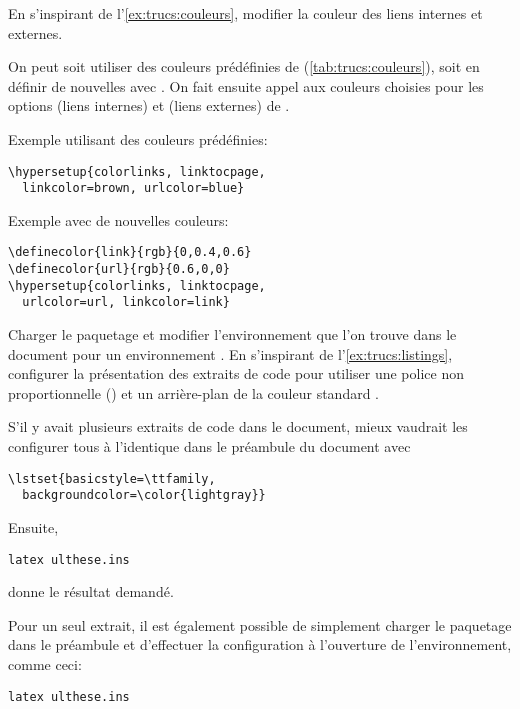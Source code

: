 \begin{exercice}
  En s'inspirant de l'\autoref{ex:trucs:couleurs}, modifier la couleur
  des liens internes et externes.
  \begin{sol}
    On peut soit utiliser des couleurs prédéfinies de 
    (\autoref{tab:trucs:couleurs}), soit en  définir de nouvelles avec
    \cmd{\definecolor}. On fait ensuite appel aux couleurs choisies
    pour les options  (liens internes) et
     (liens externes) de .

    Exemple utilisant des couleurs prédéfinies:
\begin{lstlisting}
\hypersetup{colorlinks, linktocpage,
  linkcolor=brown, urlcolor=blue}
\end{lstlisting}

    Exemple avec de nouvelles couleurs:
\begin{lstlisting}
\definecolor{link}{rgb}{0,0.4,0.6}
\definecolor{url}{rgb}{0.6,0,0}
\hypersetup{colorlinks, linktocpage,
  urlcolor=url, linkcolor=link}
\end{lstlisting}
  \end{sol}
\end{exercice}

\begin{exercice}
  \label{exercice:trucs:n}
  Charger le paquetage  et modifier l'environnement
   que l'on trouve dans le document pour un environnement
  . En s'inspirant de l'\autoref{ex:trucs:listings},
  configurer la présentation des extraits de code pour utiliser une
  police non proportionnelle (\cmdprint{\ttfamily}) et un arrière-plan
  de la couleur standard .
  \begin{sol}
    S'il y avait plusieurs extraits de code dans le document, mieux
    vaudrait les configurer tous à l'identique dans le préambule du
    document avec
\begin{lstlisting}
\lstset{basicstyle=\ttfamily,
  backgroundcolor=\color{lightgray}}
\end{lstlisting}
    Ensuite,
\begin{vglisting}
\begin{lstlisting}
latex ulthese.ins
\end{lstlisting}
\end{vglisting}
    donne le résultat demandé.

    Pour un seul extrait, il est également possible de simplement
    charger le paquetage dans le préambule et d'effectuer la
    configuration à l'ouverture de l'environnement, comme ceci:
\begin{vglisting}
\begin{lstlisting}[basicstyle=\ttfamily,
  backgroundcolor=\color{lightgray}]
latex ulthese.ins
\end{lstlisting}
\end{vglisting}
  \end{sol}
\end{exercice}



